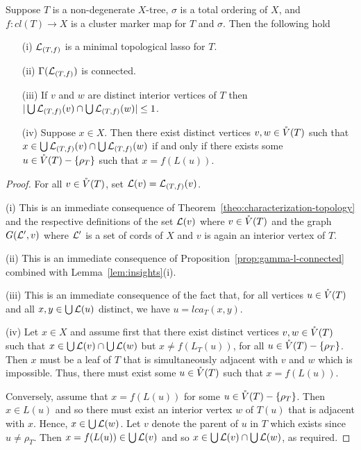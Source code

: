 \begin{lem}\label{lem:insights}
Suppose $T$ is a non-degenerate $X$-tree, 
$\sigma$ is a total ordering of $X$, and
$f:cl(T)\to X$ is a cluster
marker map for $T$ and $\sigma$. Then the following hold
\begin{enumerate}
\item[(i)]
${\mathcal L}_{(T,f)}$ is a minimal topological lasso for $T$.
\item[(ii)] $\Gamma({\mathcal L}_{(T,f)})$ is connected.
\item[(iii)] If $v$ and $w$ are distinct interior vertices of $T$
then $|\bigcup {\mathcal L}_{(T,f)}(v)\cap \bigcup {\mathcal L}_{(T,f)}(w)|\leq 1$.
\item[(iv)] Suppose $x\in X$. Then there exist distinct vertices
$v,w\in \mathring{V}(T)$ 
such that $x\in \bigcup {\mathcal L}_{(T,f)}(v)\cap \bigcup {\mathcal L}_{(T,f)}(w)$ 
if and only if there
exists some $u\in \mathring{V}(T)-\{\rho_T\}$ such that 
$x=f(L(u))$. 
\end{enumerate}
\end{lem}
\begin{proof}
For all $v\in \mathring{V}(T)$, set ${\mathcal L}(v)={\mathcal L}_{(T,f)}(v)$.

(i) This is an immediate consequence of 
Theorem~\ref{theo:characterization-topology} and
the respective definitions of the set
${\mathcal L}(v)$ where $v\in \mathring{V}(T)$
and the graph $G({\mathcal L}',v)$ where ${\mathcal L}'$ is a set
of cords of $X$ and $v$ is again an interior vertex of $T$.
 

(ii) This is an immediate consequence of 
Proposition~\ref{prop:gamma-l-connected} combined with
Lemma~\ref{lem:insights}(i).


(iii) This is an immediate consequence of the fact that, for all vertices
$u\in \mathring{V}(T)$ and all $x,y\in \bigcup{\mathcal L}(u)$ distinct, we have
$u=lca_T(x,y)$.

(iv) Let $x\in X$ and assume first that there exist 
distinct vertices $v,w\in \mathring{V}(T)$ 
such that $x\in \bigcup {\mathcal L}(v)\cap \bigcup {\mathcal L}(w)$ but
 $x\not =f(L_T(u))$, for all $u\in \mathring{V}(T)-\{\rho_T\}$. Then
 $x$ must be a leaf of $T$ that is simultaneously adjacent with $v$ and $w$
which is impossible. Thus, there must exist some $u\in \mathring{V}(T)$ such
that $x=f(L(u))$.

Conversely, assume that $x=f(L(u))$ for some 
$u\in \mathring{V}(T)-\{\rho_T\}$. Then $x\in L(u)$
and so there must exist an
interior vertex $w$ of $T(u)$ that is adjacent with $x$.
Hence, $x\in\bigcup {\mathcal L}(w)$.  Let $v$ denote the
parent of $u$ in $T$ which exists since $u\not=\rho_T$. 
Then $x=f(L(u))\in \bigcup {\mathcal L}(v)$ and so  
$x\in \bigcup {\mathcal L}(v)\cap \bigcup {\mathcal L}(w)$,
as required.
\qquad \end{proof}


